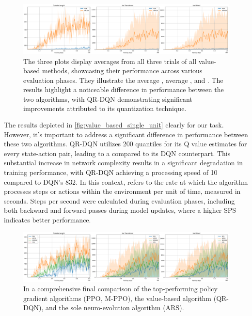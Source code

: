 \begin{figure}[htbp]
    \centering
        \centering
        \includegraphics[width=\linewidth]{images/results_singleunit/value_based_single_unit.png}
        \captionsetup{justification=justified, singlelinecheck=false, width=1\linewidth, labelfont=bf} 
        \caption{The three plots display averages from all three trials of all value-based methods, showcasing their performance across various evaluation phases. They illustrate the average , average , and . The results highlight a noticeable difference in performance between the two algorithms, with QR-DQN demonstrating significant improvements attributed to its quantization technique.}
        \label{fig:value_based_single_unit}
\end{figure}

\noindent The results depicted in \autoref{fig:value_based_single_unit} clearly  for our task. However, it's important to address a significant difference in performance between these two algorithms. QR-DQN utilizes 200 quantiles for its Q value estimates for every state-action pair, leading to a  compared to its DQN counterpart. This substantial increase in network complexity results in a significant degradation in training performance, with QR-DQN achieving a  processing speed of 10 compared to DQN's 832. In this context,  refers to the rate at which the algorithm processes steps or actions within the environment per unit of time, measured in seconds. Steps per second were calculated during evaluation phases, including both backward and forward passes during model updates, where a higher SPS indicates better performance.

\begin{figure}[htbp]
    \centering
        \centering
        \includegraphics[width=\linewidth]{images/results_singleunit/total_single_unit.png}
        \captionsetup{justification=justified, singlelinecheck=false, width=1\linewidth, labelfont=bf} 
        \caption{In a comprehensive final comparison of the top-performing policy gradient algorithms (PPO, M-PPO), the value-based algorithm (QR-DQN), and the sole neuro-evolution algorithm (ARS).}
        \label{fig:total_single_unit}
\end{figure}

